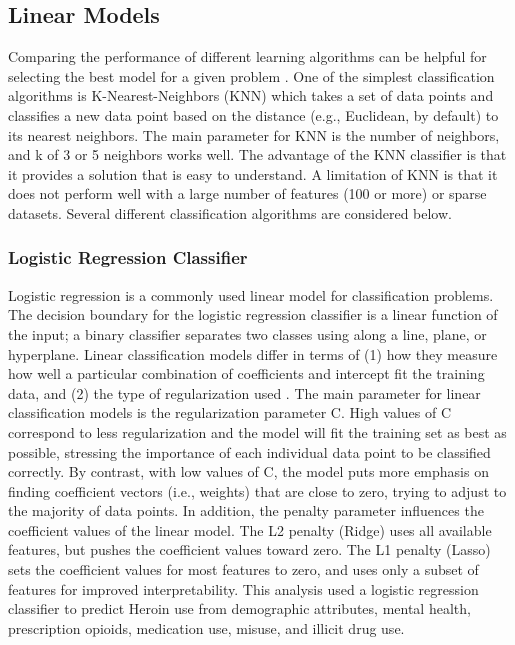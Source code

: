\documentclass[sigconf]{acmart}
\begin{document}
\subsection{Linear Models} 

Comparing the performance of different learning algorithms can be helpful for 
selecting the best model for a given problem \cite{raschka17}. One of the 
simplest classification algorithms is K-Nearest-Neighbors (KNN) which takes 
a set of data points and classifies a new data point based on the distance 
(e.g., Euclidean, by default) to its nearest neighbors. The main parameter for
KNN is the number of neighbors, and k of 3 or 5 neighbors works well. The 
advantage of the KNN classifier is that it provides a solution that is easy to 
understand. A limitation of KNN is that it does not perform well with a large 
number of features (100 or more) or sparse datasets. Several different 
classification algorithms are considered below.

\subsubsection{Logistic Regression Classifier}

Logistic regression is a commonly used linear model for classification 
problems. The decision boundary for the logistic regression classifier is a 
linear function of the input; a binary classifier separates two classes using 
along a line, plane, or hyperplane. Linear classification models differ in 
terms of (1) how they measure how well a particular combination of coefficients 
and intercept fit the training data, and (2) the type of regularization used 
\cite{muller17}. The main parameter for linear classification models is the
regularization parameter C. High values of C correspond to less regularization 
and the model will fit the training set as best as possible, stressing the 
importance of each individual data point to be classified correctly. By 
contrast, with low values of C, the model puts more emphasis on finding 
coefficient vectors (i.e., weights) that are close to zero, trying to adjust to 
the majority of data points. In addition, the penalty parameter influences the 
coefficient values of the linear model. The L2 penalty (Ridge) uses all 
available features, but pushes the coefficient values toward zero. The L1 
penalty (Lasso) sets the coefficient values for most features to zero, and uses 
only a subset of features for improved interpretability. This analysis used a 
logistic regression classifier to predict Heroin use from demographic 
attributes, mental health, prescription opioids, medication use, misuse, 
and illicit drug use. 
\end{document}
